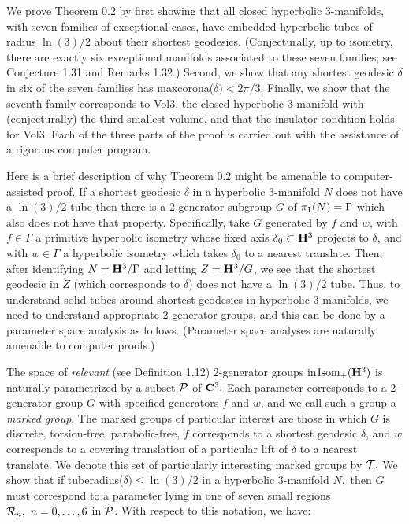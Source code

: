  
We prove Theorem 0.2 by first showing that
all closed hyperbolic $3$-manifolds, 
with seven families of exceptional cases, 
have embedded hyperbolic
tubes of radius $\ln(3)/2$ about their shortest geodesics. 
(Conjecturally, up to isometry, there are exactly six exceptional
manifolds associated to these seven families; see Conjecture 1.31 and 
Remarks 1.32.)
Second, we show that any shortest
geodesic $\delta$ in six of the seven families has
maxcorona($\delta)<2\pi/3$.
Finally, we show that the seventh family corresponds to Vol3, the closed 
hyperbolic $3$-manifold
with (conjecturally) the third smallest volume, and that the insulator 
condition holds for Vol3.  Each of the three parts of the proof is carried out 
with the assistance of a rigorous computer program.

Here is a brief description of why Theorem 0.2 might be amenable to 
computer-assisted proof.
If a shortest geodesic $\delta$ in a hyperbolic $3$-manifold $N$ does not have 
a $\ln(3)/2$
tube then there is a 2-generator subgroup $G$ of $\pi_1(N)\break =\Gamma$ which 
also does not have that property.  
Specifically, take 
$G$ generated by $f$ and $w$, with $f\in \Gamma$ a primitive
hyperbolic isometry
whose fixed axis $\delta_0 \subset {\bf H}^3$ projects to $\delta$, and 
with $w\in \Gamma$ a hyperbolic isometry
which takes $\delta_0$ to a nearest translate.
Then, after identifying $N={\bf H}^3/\Gamma$ and letting 
$Z={\bf H}^3/G$,
we see that the shortest geodesic in $Z$ (which corresponds to $\delta$)
does not have 
a $\ln(3)/2$ tube. 
Thus, to understand solid tubes around shortest geodesics in hyperbolic 
$3$-manifolds, we need to understand appropriate 2-generator groups, and this 
can be done by a parameter space analysis as follows.  (Parameter space 
analyses are naturally amenable to 
computer proofs.)

The space of {\it relevant} (see Definition 1.12) 2-generator groups 
in\break ${\rm Isom}_+({\bf H}^3)$ is naturally
parametrized by a subset ${\cal P}$ of ${\bf C}^3.$  
Each parameter corresponds to a
2-generator group $G$ with specified generators $f$ and $w$, and we call 
such a group a {\it marked group}. 
The marked groups of particular interest are those in which $G$ is
discrete, torsion-free, parabolic-free, $f$ corresponds to a shortest
geodesic $\delta$, and $w$ corresponds to a
covering translation of a particular lift of
$\delta$ to a nearest translate.  
We denote this set of particularly interesting marked groups by ${\cal T}.$
We show that if tuberadius($\delta) \le \ln(3)/2$ 
in a hyperbolic $3$-manifold $N,$ then 
$G$ must correspond to a parameter lying in one of seven small regions
${\cal R}_n,\ n=0,\ldots,6$ 
in ${\cal P}$.  
With respect to this notation, we have:

